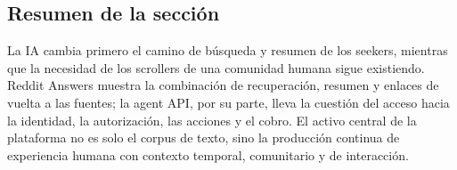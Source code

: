 \subsection{Resumen de la sección}

La IA cambia primero el camino de búsqueda y resumen de los seekers, mientras que la necesidad de los scrollers de una comunidad humana sigue existiendo. Reddit Answers muestra la combinación de recuperación, resumen y enlaces de vuelta a las fuentes; la agent API, por su parte, lleva la cuestión del acceso hacia la identidad, la autorización, las acciones y el cobro. El activo central de la plataforma no es solo el corpus de texto, sino la producción continua de experiencia humana con contexto temporal, comunitario y de interacción.
